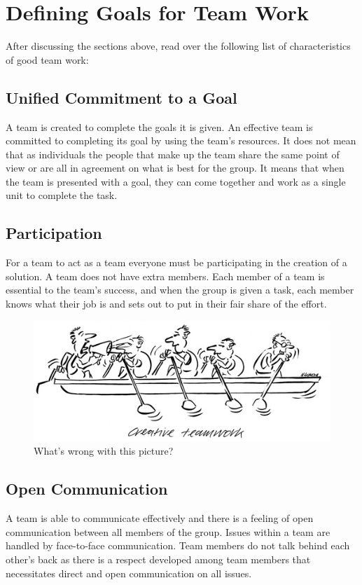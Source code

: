\documentclass{article}\usepackage[]{graphicx}\usepackage[]{color}
\begin{document}
\section{Defining Goals for Team Work} 

After discussing the sections above, read over the following list of characteristics of good team work: 

\subsection{Unified Commitment to a Goal}
A team is created to complete the goals it is given. An effective team is committed to completing its goal by using the team's resources. It does not mean that as individuals the people that make up the team share the same point of view or are all in agreement on what is best for the group. It means that when the team is presented with a goal, they can come together and work as a single unit to complete the task.

\subsection{Participation}
For a team to act as a team everyone must be participating in the creation of a solution. A team does not have extra members. Each member of a team is essential to the team's success, and when the group is given a task, each member knows what their job is and sets out to put in their fair share of the effort.

\begin{figure}
\includegraphics[width=1.00\textwidth]{../../Graphics/creative_teamwork.jpg}
\caption{What's wrong with this picture?}
\end{figure}

\subsection{Open Communication}
A team is able to communicate effectively and there is a feeling of open communication between all members of the group. Issues within a team are handled by face-to-face communication. Team members do not talk behind each other's back as there is a respect developed among team members that necessitates direct and open communication on all issues.
\end{document}

